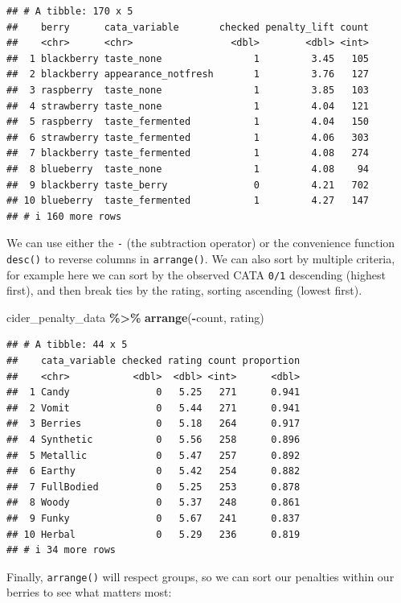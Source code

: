\documentclass[
]{book}
\newenvironment{Shaded}{\begin{snugshade}}{\end{snugshade}}
\newcommand{\FunctionTok}[1]{\textcolor[rgb]{0.13,0.29,0.53}{\textbf{#1}}}
\newcommand{\NormalTok}[1]{#1}
\newcommand{\SpecialCharTok}[1]{\textcolor[rgb]{0.81,0.36,0.00}{\textbf{#1}}}
\begin{document}
\begin{verbatim}
## # A tibble: 170 x 5
##    berry      cata_variable       checked penalty_lift count
##    <chr>      <chr>                 <dbl>        <dbl> <int>
##  1 blackberry taste_none                1         3.45   105
##  2 blackberry appearance_notfresh       1         3.76   127
##  3 raspberry  taste_none                1         3.85   103
##  4 strawberry taste_none                1         4.04   121
##  5 raspberry  taste_fermented           1         4.04   150
##  6 strawberry taste_fermented           1         4.06   303
##  7 blackberry taste_fermented           1         4.08   274
##  8 blueberry  taste_none                1         4.08    94
##  9 blackberry taste_berry               0         4.21   702
## 10 blueberry  taste_fermented           1         4.27   147
## # i 160 more rows
\end{verbatim}

We can use either the \texttt{-} (the subtraction operator) or the convenience function \texttt{desc()} to reverse columns in \texttt{arrange()}. We can also sort by multiple criteria, for example here we can sort by the observed CATA \texttt{0/1} descending (highest first), and then break ties by the rating, sorting ascending (lowest first).

\begin{Shaded}
\begin{Highlighting}[]
\NormalTok{cider\_penalty\_data }\SpecialCharTok{\%\textgreater{}\%}
  \FunctionTok{arrange}\NormalTok{(}\SpecialCharTok{{-}}\NormalTok{count, rating)}
\end{Highlighting}
\end{Shaded}

\begin{verbatim}
## # A tibble: 44 x 5
##    cata_variable checked rating count proportion
##    <chr>           <dbl>  <dbl> <int>      <dbl>
##  1 Candy               0   5.25   271      0.941
##  2 Vomit               0   5.44   271      0.941
##  3 Berries             0   5.18   264      0.917
##  4 Synthetic           0   5.56   258      0.896
##  5 Metallic            0   5.47   257      0.892
##  6 Earthy              0   5.42   254      0.882
##  7 FullBodied          0   5.25   253      0.878
##  8 Woody               0   5.37   248      0.861
##  9 Funky               0   5.67   241      0.837
## 10 Herbal              0   5.29   236      0.819
## # i 34 more rows
\end{verbatim}

Finally, \texttt{arrange()} will respect groups, so we can sort our penalties within our berries to see what matters most:
\end{document}
